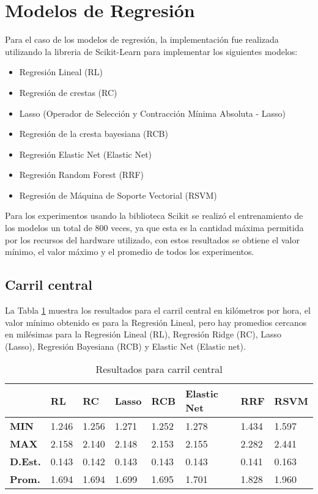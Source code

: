 \section{Modelos de Regresión}

Para el caso de los modelos de regresión, la implementación fue realizada utilizando la libreria de Scikit-Learn para implementar los siguientes modelos:

\begin{itemize}
    \item Regresión Lineal (RL)
    \item Regresión de crestas (RC)
    \item Lasso (Operador de Selección y Contracción Mínima Absoluta - Lasso)
    \item Regresión de la cresta bayesiana (RCB)
    \item Regresión Elastic Net (Elastic Net)
    \item Regresión Random Forest (RRF)
    \item Regresión de Máquina de Soporte Vectorial (RSVM)
\end{itemize}

Para los experimentos usando la biblioteca Scikit se realizó el entrenamiento de los modelos un total de 800 veces, ya que esta es la cantidad máxima permitida por los recursos del hardware utilizado, con estos resultados se obtiene el valor mínimo, el valor máximo y el promedio de todos los experimentos.

\subsection{Carril central}

La Tabla \ref{tab:resultadosScikitCarrilCentral} muestra los resultados para el carril central en kilómetros por hora, el valor mínimo obtenido es para la Regresión Lineal, pero hay promedios cercanos en milésimas para la Regresión Lineal (RL), Regresión Ridge (RC), Lasso (Lasso), Regresión Bayesiana (RCB) y Elastic Net (Elastic net).

\begin{table}[H]
    \centering
    \caption{Resultados para carril central}
    \label{tab:resultadosScikitCarrilCentral}
    \begin{tabular}{|l|l|l|l|l|l|l|l|}
    \hline
        & \textbf{RL} & \textbf{RC} & \textbf{Lasso} & \textbf{RCB} & \textbf{Elastic Net} & \textbf{RRF} & \textbf{RSVM} \\ \hline
        \textbf{MIN} & 1.246 & 1.256 & 1.271 & 1.252 & 1.278 & 1.434 & 1.597 \\ \hline
        \textbf{MAX} & 2.158 & 2.140 & 2.148 & 2.153 & 2.155 & 2.282 & 2.441 \\ \hline
        \textbf{D.Est.} & 0.143 & 0.142 & 0.143 & 0.143 & 0.143 & 0.141 & 0.163 \\ \hline
        \textbf{Prom.} & 1.694 & 1.694 & 1.699 & 1.695 & 1.701 & 1.828 & 1.960 \\ \hline
    \end{tabular}
\end{table}


